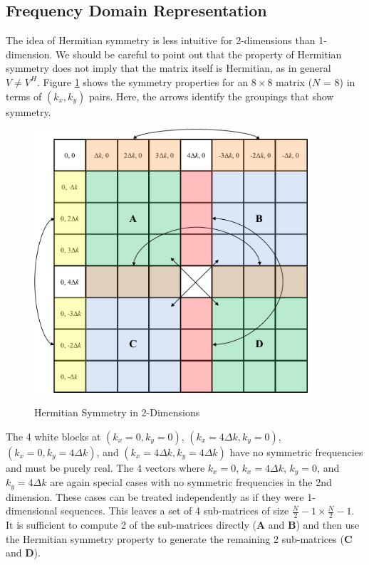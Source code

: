 \subsection{Frequency Domain Representation}
The idea of Hermitian symmetry is less intuitive for 2-dimensions than 1-dimension. We should be careful to point out that the property of Hermitian symmetry does not imply that the matrix itself is Hermitian, as in general $V \neq V^H$. Figure \ref{os_fig:7dd} shows the symmetry properties for an $8 \times 8$ matrix ($N$ = 8) in terms of $(k_x, k_y)$ pairs. Here, the arrows identify the groupings that show symmetry. 
\begin{figure}[H]
  \begin{center}
\includegraphics[width=4in]{../media/Ocean_Surface/2-d_hermitian_symmetry.png}
  \end{center}
  \renewcommand{\baselinestretch}{1} \small\normalsize
  \begin{quote}
    \caption[Hermitian Symmetry in 2-Dimensions]{Hermitian Symmetry in 2-Dimensions \label{os_fig:7dd}}
  \end{quote}
\end{figure}
\renewcommand{\baselinestretch}{2} \small\normalsize
The 4 white blocks at $(k_x=0, k_y=0)$, $(k_x=4\Delta k, k_y=0)$, $(k_x=0, k_y=4\Delta k)$, and $(k_x=4\Delta k, k_y=4\Delta k)$ have no symmetric frequencies and must be purely real. The 4 vectors where $k_x = 0$, $k_x = 4\Delta k$, $k_y = 0$, and $k_y = 4\Delta k$ are again special cases with no symmetric frequencies in the 2nd dimension. These cases can be treated independently as if they were 1-dimensional sequences. This leaves a set of 4 sub-matrices of size $\frac{N}{2} - 1 \times \frac{N}{2} - 1$. It is sufficient to compute 2 of the sub-matrices directly ($\mathbf{A}$ and $\mathbf{B}$) and then use the Hermitian symmetry property to generate the remaining 2 sub-matrices ($\mathbf{C}$ and $\mathbf{D}$).

